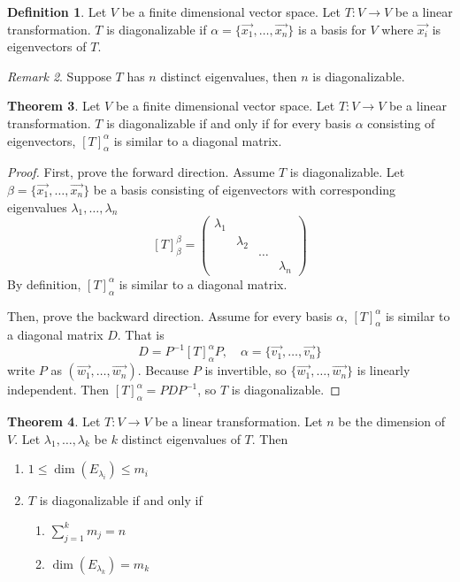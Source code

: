 \documentclass{article}
\theoremstyle{definition}
\newtheorem{theorem}{Theorem}[section]
\newtheorem{definition}[theorem]{Definition}
\theoremstyle{remark}
\newtheorem{remark}[theorem]{Remark}
\begin{document}
\begin{definition}
    Let $V$ be a finite dimensional vector space.
    Let $T:V\rightarrow V$ be a linear transformation.
    $T$ is diagonalizable if $\alpha=\{\vec{x_1},\dots, \vec{x_n}\}$ is a basis for $V$ where $\vec{x_i}$ is eigenvectors of $T$.
\end{definition}

\begin{remark}
    Suppose $T$ has $n$ distinct eigenvalues, then $n$ is diagonalizable.
\end{remark}

\begin{theorem}
    Let $V$ be a finite dimensional vector space.
    Let $T:V\rightarrow V$ be a linear transformation.
    $T$ is diagonalizable if and only if for every basis $\alpha$ consisting of eigenvectors, $[T]_{\alpha}^{\alpha}$ is similar to a diagonal matrix.
\end{theorem}

\begin{proof}
    First, prove the forward direction.
    Assume $T$ is diagonalizable.
    Let $\beta=\{\vec{x_1},\dots, \vec{x_n}\}$ be a basis consisting of eigenvectors with corresponding eigenvalues $\lambda_1,\dots,\lambda_n$
    \[
    [T]^{\beta}_{\beta}=
    \begin{pmatrix}
        \lambda_1 & & &\\
        & \lambda_2 & &\\
        & & \dots &\\
        & & & \lambda_n
    \end{pmatrix}
    \]
    By definition, $[T]_{\alpha}^{\alpha}$ is similar to a diagonal matrix.
    
    Then, prove the backward direction. 
    Assume for every basis $\alpha$, $[T]_{\alpha}^{\alpha}$ is similar to a diagonal matrix $D$. That is 
    \[
    D = P^{-1}[T]_{\alpha}^{\alpha}P,\quad\alpha=\{\vec{v_1}, \dots, \vec{v_n}\}
    \]
    write $P$ as $(\vec{w_1}, \dots, \vec{w_n})$. Because $P$ is invertible, so $\{\vec{w_1}, \dots, \vec{w_n}\}$ is linearly independent. Then $[T]_{\alpha}^{\alpha} = PDP^{-1}$, so $T$ is diagonalizable.
\end{proof}

\begin{theorem}
    Let $T:V\rightarrow V$ be a linear transformation.
    Let $n$ be the dimension of $V$.
    Let $\lambda_1, \ldots, \lambda_k$ be $k$ distinct eigenvalues of $T$. Then
    \begin{enumerate}
        \item $1\leq \dim(E_{\lambda_i})\leq m_i$
        \item $T$ is diagonalizable if and only if
        \begin{enumerate}
            \item $\sum_{j=1}^{k}m_j=n$
            \item $\dim(E_{\lambda_k})=m_k$
        \end{enumerate}
    \end{enumerate}
    
\end{theorem}
\end{document}
